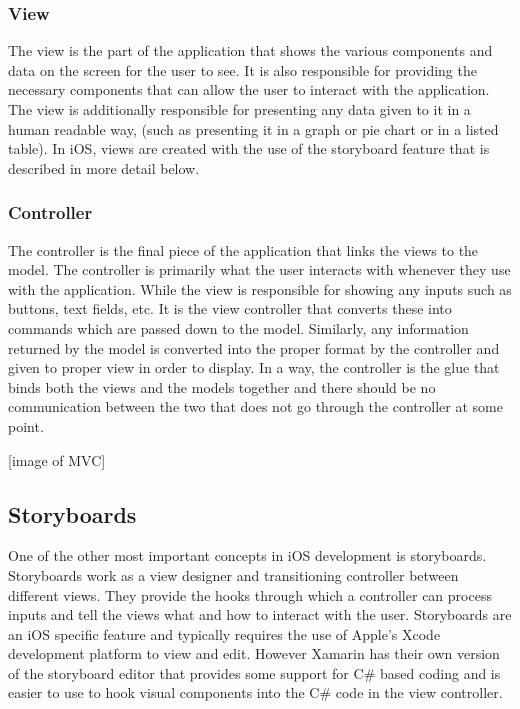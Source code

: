\documentclass[main.tex]{subfiles}
\begin{document}
\subsubsection{View}

The view is the part of the application that shows the various components and data on the screen for the user to see. It is also responsible for providing the necessary components that can allow the user to interact with the application. The view is additionally responsible for presenting any data given to it in a human readable way, (such as presenting it in a graph or pie chart or in a listed table). In iOS, views are created with the use of the storyboard feature that is described in more detail below.

\subsubsection{Controller}

The controller is the final piece of the application that links the views to the model. The controller is primarily what the user interacts with whenever they use with the application. While the view is responsible for showing any inputs such as buttons, text fields, etc. It is the view controller that converts these into commands which are passed down to the model. Similarly, any information returned by the model is converted into the proper format by the controller and given to proper view in order to display. In a way, the controller is the glue that binds both the views and the models together and there should be no communication between the two that does not go through the controller at some point.

[image of MVC]

\subsection{Storyboards}
One of the other most important concepts in iOS development is storyboards. Storyboards work as a view designer and transitioning controller between different views. They provide the hooks through which a controller can process inputs and tell the views what and how to interact with the user. Storyboards are an iOS specific feature and typically requires the use of Apple's Xcode development platform to view and edit. However Xamarin has their own version of the storyboard editor that provides some support for C\# based coding and is easier to use to hook visual components into the C\# code in the view controller.
\end{document}
